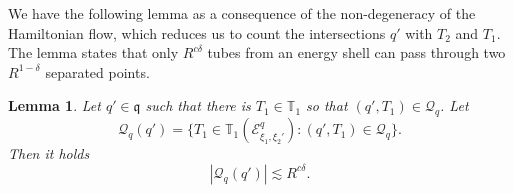 \documentclass{amsart}
\newtheorem{lemma}[theorem]{Lemma}
\theoremstyle{definition}
\newcommand{\T}{\mathbb{T}}
\begin{document}
We have the following lemma as a consequence of the non-degeneracy of the Hamiltonian flow, which reduces us to count the intersections $q'$ with $T_2$ and $T_1$. The lemma states that only $R^{c\delta}$ tubes from an energy shell can pass through two $R^{1-\delta}$ separated points.
\begin{lemma}
\label{lem:TubeCountingAuxNondegenerate}
Let $q' \in \mathfrak{q}$ such that there is $T_1 \in \T_1$ so that $ (q',T_1) \in \mathcal{Q}_{q}$. Let
\begin{equation*}
\mathcal{Q}_{q}(q') = \{ T_1 \in \T_1(\mathcal{E}^{q}_{\xi_1,\xi_2'}) : (q',T_1) \in \mathcal{Q}_{q} \}.
\end{equation*}
Then it holds
\begin{equation*}
|\mathcal{Q}_{q}(q')| \lesssim R^{c \delta}.
\end{equation*}
\end{lemma}
\end{document}
